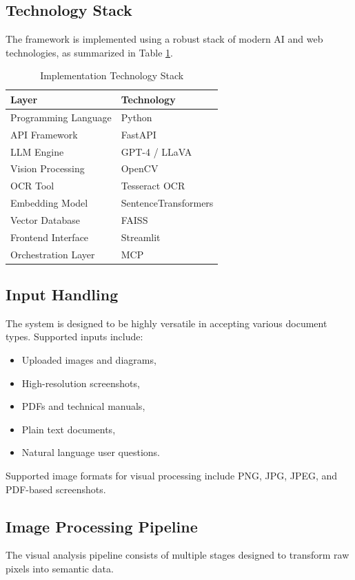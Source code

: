 \documentclass[conference]{IEEEtran}
\begin{document}
\subsection{Technology Stack}
The framework is implemented using a robust stack of modern AI and web technologies, as summarized in Table \ref{tab:tech_stack}.

\begin{table}[htbp]
\centering
\caption{Implementation Technology Stack}
\label{tab:tech_stack}
\begin{tabular}{|l|l|}
\hline
\textbf{Layer} & \textbf{Technology} \\ \hline
Programming Language & Python \\ \hline
API Framework & FastAPI \\ \hline
LLM Engine & GPT-4 / LLaVA \\ \hline
Vision Processing & OpenCV \\ \hline
OCR Tool & Tesseract OCR \\ \hline
Embedding Model & SentenceTransformers \\ \hline
Vector Database & FAISS \\ \hline
Frontend Interface & Streamlit \\ \hline
Orchestration Layer & MCP \\ \hline
\end{tabular}
\end{table}

\subsection{Input Handling}
The system is designed to be highly versatile in accepting various document types. Supported inputs include:
\begin{itemize}
    \item Uploaded images and diagrams,
    \item High-resolution screenshots,
    \item PDFs and technical manuals,
    \item Plain text documents,
    \item Natural language user questions.
\end{itemize}
Supported image formats for visual processing include PNG, JPG, JPEG, and PDF-based screenshots.

\subsection{Image Processing Pipeline}
The visual analysis pipeline consists of multiple stages designed to transform raw pixels into semantic data.
\end{document}
